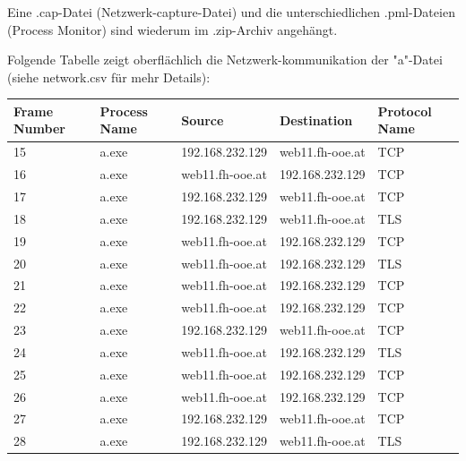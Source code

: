 \documentclass{article}
\begin{document}
	\begin{mynote}
		Eine .cap-Datei (Netzwerk-capture-Datei) und die unterschiedlichen .pml-Dateien (Process Monitor) sind wiederum im .zip-Archiv angehängt.
	\end{mynote}

	\pagebreak
	
	\noindent Folgende Tabelle zeigt oberflächlich die Netzwerk-kommunikation der "a"-Datei (siehe network.csv für mehr Details):\\
	\begin{table}[htbp]
		\centering
		\small
		\begin{tabular}{|m{1cm}|m{1.5cm}|m{3cm}|m{3cm}|m{1.4cm}|}
			\hline
			\textbf{Frame Number} & \textbf{Process Name} &          \textbf{Source} &    \textbf{Destination} & \textbf{Protocol Name} \\ \hline
			15 &        a.exe & 192.168.232.129 & web11.fh-ooe.at &           TCP \\ \hline
			16 &        a.exe & web11.fh-ooe.at & 192.168.232.129 &           TCP \\ \hline
			17 &        a.exe & 192.168.232.129 & web11.fh-ooe.at &           TCP \\ \hline
			18 &        a.exe & 192.168.232.129 & web11.fh-ooe.at &           TLS \\ \hline
			19 &        a.exe & web11.fh-ooe.at & 192.168.232.129 &           TCP \\ \hline
			20 &        a.exe & web11.fh-ooe.at & 192.168.232.129 &           TLS \\ \hline
			21 &        a.exe & web11.fh-ooe.at & 192.168.232.129 &           TCP \\ \hline
			22 &        a.exe & web11.fh-ooe.at & 192.168.232.129 &           TCP \\ \hline
			23 &        a.exe & 192.168.232.129 & web11.fh-ooe.at &           TCP \\ \hline
			24 &        a.exe & web11.fh-ooe.at & 192.168.232.129 &           TLS \\ \hline
			25 &        a.exe & web11.fh-ooe.at & 192.168.232.129 &           TCP \\ \hline
			26 &        a.exe & web11.fh-ooe.at & 192.168.232.129 &           TCP \\ \hline
			27 &        a.exe & 192.168.232.129 & web11.fh-ooe.at &           TCP \\ \hline
			28 &        a.exe & 192.168.232.129 & web11.fh-ooe.at &           TLS \\ \hline

\end{tabular}
\end{table}
\end{document}
